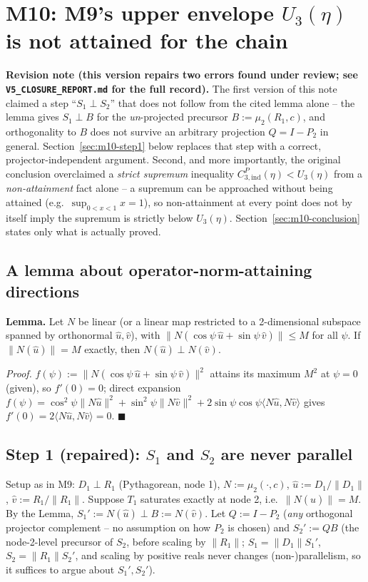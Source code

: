 \section*{M10: M9's upper envelope $U_3(\eta)$ is not attained for the chain}
\label{sec:k3-m10}

\textbf{Revision note (this version repairs two errors found under
review; see \texttt{V5\_CLOSURE\_REPORT.md} for the full record).} The
first version of this note claimed a step ``$S_1\perp S_2$'' that does
not follow from the cited lemma alone -- the lemma gives $S_1\perp B$
for the \emph{un}-projected precursor $B:=\mu_2(R_1,c)$, and orthogonality
to $B$ does not survive an arbitrary projection $Q=I-P_2$ in general.
Section~\ref{sec:m10-step1} below replaces that step with a correct,
projector-independent argument. Second, and more importantly, the
original conclusion overclaimed a \emph{strict supremum} inequality
$C_{3,\mathrm{ind}}^P(\eta)<U_3(\eta)$ from a \emph{non-attainment} fact
alone -- a supremum can be approached without being attained (e.g.\
$\sup_{0<x<1}x=1$), so non-attainment at every point does not by itself
imply the supremum is strictly below $U_3(\eta)$. Section~\ref{sec:m10-conclusion}
states only what is actually proved.

\subsection*{A lemma about operator-norm-attaining directions}

\textbf{Lemma.} Let $N$ be linear (or a linear map restricted to a
2-dimensional subspace spanned by orthonormal $\hat u,\hat v$), with
$\|N(\cos\psi\,\hat u+\sin\psi\,\hat v)\|\le M$ for all $\psi$. If
$\|N(\hat u)\|=M$ exactly, then $N(\hat u)\perp N(\hat v)$.

\textit{Proof.} $f(\psi):=\|N(\cos\psi\,\hat u+\sin\psi\,\hat v)\|^2$
attains its maximum $M^2$ at $\psi=0$ (given), so $f'(0)=0$; direct
expansion $f(\psi)=\cos^2\psi\|N\hat u\|^2+\sin^2\psi\|N\hat v\|^2+
2\sin\psi\cos\psi\langle N\hat u,N\hat v\rangle$ gives
$f'(0)=2\langle N\hat u,N\hat v\rangle=0$. $\blacksquare$

\subsection*{Step 1 (repaired): $S_1$ and $S_2$ are never parallel}
\label{sec:m10-step1}

Setup as in M9: $D_1\perp R_1$ (Pythagorean, node 1), $N:=\mu_2(\cdot,c)$,
$\hat u:=D_1/\|D_1\|$, $\hat v:=R_1/\|R_1\|$. Suppose $T_1$ saturates
exactly at node 2, i.e.\ $\|N(\hat u)\|=M$. By the Lemma,
$S_1':=N(\hat u)\perp B:=N(\hat v)$. Let $Q:=I-P_2$ (\emph{any} orthogonal
projector complement -- no assumption on how $P_2$ is chosen) and
$S_2':=QB$ (the node-2-level precursor of $S_2$, before scaling by
$\|R_1\|$; $S_1=\|D_1\|S_1'$, $S_2=\|R_1\|S_2'$, and scaling by positive
reals never changes (non-)parallelism, so it suffices to argue about
$S_1',S_2'$).

